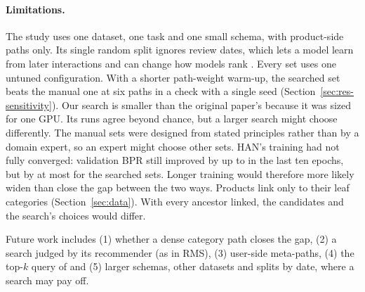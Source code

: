 \paragraph{Limitations.} The study uses one dataset, one task and one small schema, with
product-side paths only. Its single random split ignores review dates, which lets a model learn from
later interactions and can change how models rank \citep{ji2023leakage,meng2020splitting}. Every
set uses one untuned configuration. With a shorter path-weight warm-up, the searched set beats the
manual one at six paths in a check with a single seed (Section~\ref{sec:res-sensitivity}). Our
search is smaller than the original paper's because it was sized for one GPU. Its runs agree beyond
chance, but a larger search might choose differently. The manual sets were designed from stated
principles rather than by a domain expert, so an expert might choose other sets. HAN's training had
not fully converged: validation BPR still improved by up to  in the last ten
epochs, but by at most  for the searched sets. Longer training would
therefore more likely widen than close the gap between the two ways. Products link only to their
leaf categories (Section~\ref{sec:data}). With every ancestor linked, the candidates and the
search's choices would differ.

Future work includes (1) whether a dense category path closes the gap, (2) a search judged by its
recommender (as in RMS), (3) user-side meta-paths, (4) the top-$k$ query of \citet{zhu2020topk}
and (5) larger schemas, other datasets and splits by date, where a search may pay off.
